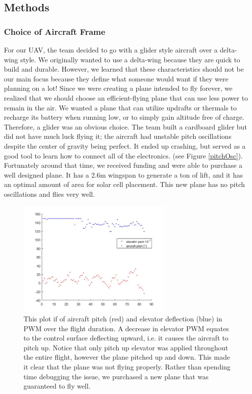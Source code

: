 \documentclass[12pt,journal,compsoc]{IEEEtran}
\begin{document}
\subsection{Methods}
\subsubsection{Choice of Aircraft Frame}
For our UAV, the team decided to go with a glider style aircraft over a delta-wing style. We originally wanted to use a delta-wing because they are quick to build and durable. However, we learned that these characteristics should not be our main focus because they define what someone would want if they were planning on a lot! Since we were creating a plane intended to fly forever, we realized that we should choose an efficient-flying plane that can use less power to remain in the air. We wanted a plane that can utilize updrafts or thermals to recharge its battery when running low, or to simply gain altitude free of charge. Therefore, a glider was an obvious choice. The team built a cardboard glider but did not have much luck flying it; the aircraft had unstable pitch oscillations despite the center of gravity being perfect. It ended up crashing, but served as a good tool to learn how to connect all of the electronics. (see Figure \ref{pitchOsc}). Fortunately around that time, we received funding and were able to purchase a well designed plane. It has a 2.6m wingspan to generate a ton of lift, and it has an optimal amount of area for solar cell placement. This new plane has no pitch oscillations and flies very well.
\begin{figure}[h!]
\hspace*{0cm}
\centering
\includegraphics[width=3in]{pitch_elevPWM.jpg}
\caption{This plot if of aircraft pitch (red) and elevator deflection (blue) in PWM over the flight duration. A decrease in elevator PWM equates to the control surface deflecting upward, i.e. it causes the aircraft to pitch up. Notice that only pitch up elevator was applied throughout the entire flight, however the plane pitched up and down. This made it clear that the plane was not flying properly. Rather than spending time debugging the issue, we purchased a new plane that was guaranteed to fly well.}
\label{gliderAndBird}
\end{figure}
\end{document}

